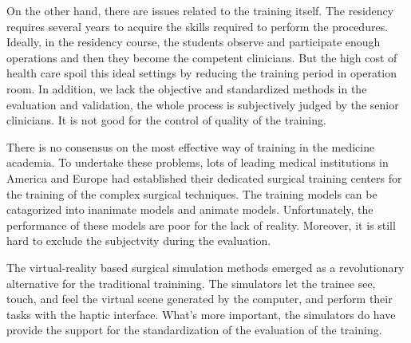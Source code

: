 On the other hand, there are issues related to the training itself. The residency 
requires several years to acquire the skills required to perform the procedures. 
Ideally, in the residency course, the students observe and participate enough 
operations and then they become the competent clinicians. But the high cost of 
health care spoil this ideal settings by reducing the training period in operation 
room. In addition, we lack the objective and standardized methods in the 
evaluation and validation, the whole process is subjectively judged by the senior 
clinicians. It is not good for the control of quality of the training.

There is no consensus on the most effective way of training in the medicine 
academia. To undertake these problems, lots of leading medical institutions in 
America and Europe had established their dedicated surgical training centers 
for the training of the complex surgical techniques. The training models can be 
catagorized into inanimate models and animate models. Unfortunately, the 
performance of these models are poor for the lack of reality. Moreover, it is 
still hard to exclude the subjectvity during the evaluation.

The virtual-reality based surgical simulation methods emerged as a revolutionary 
alternative for the traditional trainining. The simulators let the trainee see, 
touch, and feel the virtual scene generated by the computer, and perform their 
tasks with the haptic interface. What's more important, the simulators do have 
provide the support for the standardization of the evaluation of the training.

